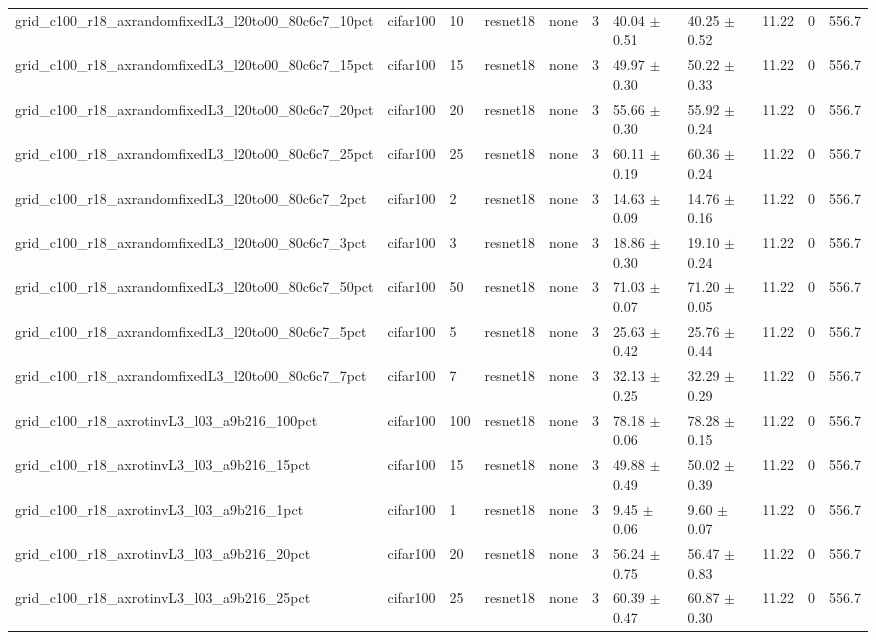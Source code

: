 \begin{tabular}{lllllllllll}
grid_c100_r18_axrandomfixedL3_l20to00_80c6c7_10pct & cifar100 & 10 & resnet18 & none & 3 & 40.04 $\pm$ 0.51 & 40.25 $\pm$ 0.52 & 11.22 & 0 & 556.7 \\
grid_c100_r18_axrandomfixedL3_l20to00_80c6c7_15pct & cifar100 & 15 & resnet18 & none & 3 & 49.97 $\pm$ 0.30 & 50.22 $\pm$ 0.33 & 11.22 & 0 & 556.7 \\
grid_c100_r18_axrandomfixedL3_l20to00_80c6c7_20pct & cifar100 & 20 & resnet18 & none & 3 & 55.66 $\pm$ 0.30 & 55.92 $\pm$ 0.24 & 11.22 & 0 & 556.7 \\
grid_c100_r18_axrandomfixedL3_l20to00_80c6c7_25pct & cifar100 & 25 & resnet18 & none & 3 & 60.11 $\pm$ 0.19 & 60.36 $\pm$ 0.24 & 11.22 & 0 & 556.7 \\
grid_c100_r18_axrandomfixedL3_l20to00_80c6c7_2pct & cifar100 & 2 & resnet18 & none & 3 & 14.63 $\pm$ 0.09 & 14.76 $\pm$ 0.16 & 11.22 & 0 & 556.7 \\
grid_c100_r18_axrandomfixedL3_l20to00_80c6c7_3pct & cifar100 & 3 & resnet18 & none & 3 & 18.86 $\pm$ 0.30 & 19.10 $\pm$ 0.24 & 11.22 & 0 & 556.7 \\
grid_c100_r18_axrandomfixedL3_l20to00_80c6c7_50pct & cifar100 & 50 & resnet18 & none & 3 & 71.03 $\pm$ 0.07 & 71.20 $\pm$ 0.05 & 11.22 & 0 & 556.7 \\
grid_c100_r18_axrandomfixedL3_l20to00_80c6c7_5pct & cifar100 & 5 & resnet18 & none & 3 & 25.63 $\pm$ 0.42 & 25.76 $\pm$ 0.44 & 11.22 & 0 & 556.7 \\
grid_c100_r18_axrandomfixedL3_l20to00_80c6c7_7pct & cifar100 & 7 & resnet18 & none & 3 & 32.13 $\pm$ 0.25 & 32.29 $\pm$ 0.29 & 11.22 & 0 & 556.7 \\
grid_c100_r18_axrotinvL3_l03_a9b216_100pct & cifar100 & 100 & resnet18 & none & 3 & 78.18 $\pm$ 0.06 & 78.28 $\pm$ 0.15 & 11.22 & 0 & 556.7 \\
grid_c100_r18_axrotinvL3_l03_a9b216_15pct & cifar100 & 15 & resnet18 & none & 3 & 49.88 $\pm$ 0.49 & 50.02 $\pm$ 0.39 & 11.22 & 0 & 556.7 \\
grid_c100_r18_axrotinvL3_l03_a9b216_1pct & cifar100 & 1 & resnet18 & none & 3 & 9.45 $\pm$ 0.06 & 9.60 $\pm$ 0.07 & 11.22 & 0 & 556.7 \\
grid_c100_r18_axrotinvL3_l03_a9b216_20pct & cifar100 & 20 & resnet18 & none & 3 & 56.24 $\pm$ 0.75 & 56.47 $\pm$ 0.83 & 11.22 & 0 & 556.7 \\
grid_c100_r18_axrotinvL3_l03_a9b216_25pct & cifar100 & 25 & resnet18 & none & 3 & 60.39 $\pm$ 0.47 & 60.87 $\pm$ 0.30 & 11.22 & 0 & 556.7 \\

\end{tabular}
